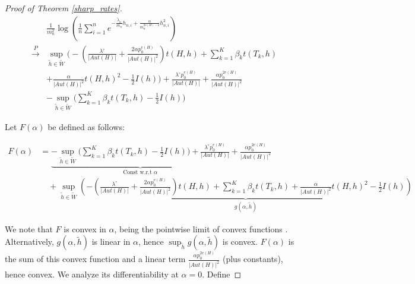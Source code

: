 \documentclass[12pt]{article}
\numberwithin{equation}{section}
\begin{document}
\begin{proof}[Proof of Theorem \ref{sharp_rates}]
\begin{align}
&\frac{1}{m_n^2}\log\left(\frac{1}{n}\sum_{i=1}^n 
e^{-\frac{\tilde{\lambda}_n}{m_n} h_{n,i} + \frac{\alpha}{m_n^{2v(H)-2}}h_{n,i}^2}\right)\\
\xrightarrow{P}&\sup_{\tilde{h}\in\tilde{W}}\bigg(-\left(\frac{\lambda^{\circ}}{|Aut(H)|}
+\frac{2\alpha p_0^{e(H)}}{|Aut(H)|^2}\right) t(H,h) 
+ \sum_{k=1}^K \beta_k t(T_k, h) \nonumber \\
&+ \frac{\alpha}{|Aut(H)|^2} t(H,h)^2 - \frac{1}{2} I(h)\bigg) 
+ \frac{\lambda^{\circ} p_0^{e(H)}}{\lvert Aut(H)\rvert} 
+ \frac{\alpha p_0^{2e(H)}}{\lvert Aut(H)\rvert^2} \nonumber \\
&- \sup_{\tilde{h}\in\tilde{W}}\bigg( \sum_{k=1}^K \beta_k t(T_k, h) 
- \frac{1}{2} I(h)\bigg)\label{scaled_part_conv_2}
\end{align}


Let $F(\alpha)$ be defined as follows:

\begin{align*}
 F(\alpha) &= \underbrace{-\sup_{\tilde{h}\in\tilde{W}}\bigg( \sum_{k=1}^K \beta_k t(T_k, h) 
      - \frac{1}{2} I(h)\bigg)+\frac{\lambda^{\circ} p_0^{e(H)}}{\lvert Aut(H)\rvert}}_{\text{Const w.r.t } \alpha} + \frac{\alpha p_0^{2e(H)}}{\lvert Aut(H)\rvert^2} \\
&\quad + \sup_{\tilde{h}\in\tilde{W}}\underbrace{\left(-\left(\frac{\lambda^{\circ}}{\lvert Aut(H)\rvert}+\frac{2\alpha p_0^{e(H)}}{\lvert Aut(H)\rvert^2}\right) t(H,h) + \sum_{k=1}^K \beta_k t(T_k, h) + \frac{\alpha}{\lvert Aut(H)\rvert^2} t(H,h)^2-\frac{1}{2} I (h)\right)}_{g(\alpha, \tilde{h})}
\end{align*}


We note that $F$ is convex in $\alpha$, being the pointwise limit of convex functions . Alternatively, $g(\alpha, \tilde{h})$ is linear in $\alpha$, hence $\sup_{\tilde{h}} g(\alpha, \tilde{h})$ is convex. $F(\alpha)$ is the sum of this convex function and a linear term $\frac{\alpha p_0^{2e(H)}}{\lvert Aut(H)\rvert^2}$ (plus constants), hence convex. We analyze its differentiability at $\alpha=0$. Define 


\end{proof}
\end{document}
